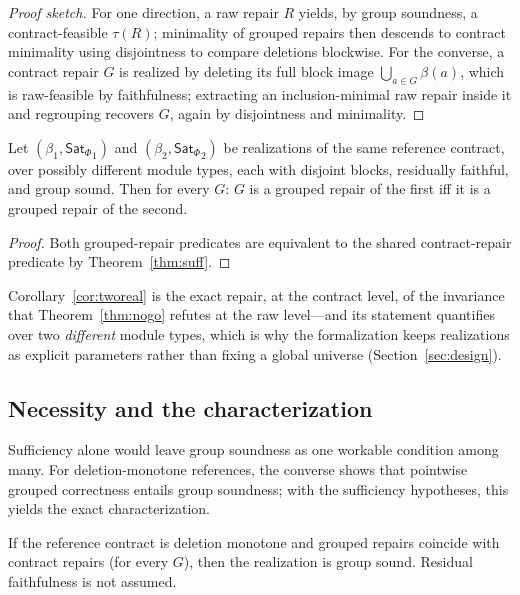 \documentclass[sigplan,10pt,review,anonymous,nonacm]{acmart}
\theoremstyle{acmdefinition}
\newcommand{\SatPhi}{{\mathsf{Sat}_\Phi}}
\begin{document}
\begin{proof}[Proof sketch]
For one direction, a raw repair $R$ yields, by group soundness, a
contract-feasible $\tau(R)$; minimality of grouped repairs then descends to
contract minimality using disjointness to compare deletions blockwise. For
the converse, a contract repair $G$ is realized by deleting its full block
image $\bigcup_{a \in G}\beta(a)$, which is raw-feasible by faithfulness;
extracting an inclusion-minimal raw repair inside it and regrouping recovers
$G$, again by disjointness and minimality.
\end{proof}

\begin{corollary}
\label{cor:tworeal}
Let $(\beta_1, \SatPhi_1)$ and $(\beta_2, \SatPhi_2)$ be realizations of the
same reference contract, over possibly different module types, each with
disjoint blocks, residually faithful, and group sound. Then for every $G$:
$G$ is a grouped repair of the first iff it is a grouped repair of the
second.
\end{corollary}

\begin{proof}
Both grouped-repair predicates are equivalent to the shared contract-repair
predicate by Theorem~\ref{thm:suff}.
\end{proof}

Corollary~\ref{cor:tworeal} is the exact repair, at the contract level, of
the invariance that Theorem~\ref{thm:nogo} refutes at the raw level---and its
statement quantifies over two \emph{different} module types, which is why the
formalization keeps realizations as explicit parameters rather than fixing a
global universe (Section~\ref{sec:design}).

\subsection{Necessity and the characterization}

Sufficiency alone would leave group soundness as one workable condition among
many. For deletion-monotone references, the converse shows that pointwise
grouped correctness entails group soundness; with the sufficiency hypotheses,
this yields the exact characterization.

\begin{theorem}
\label{thm:conv}
If the reference contract is deletion monotone and grouped repairs coincide
with contract repairs (for every $G$), then the realization is group sound.
Residual faithfulness is not assumed.
\end{theorem}
\end{document}
